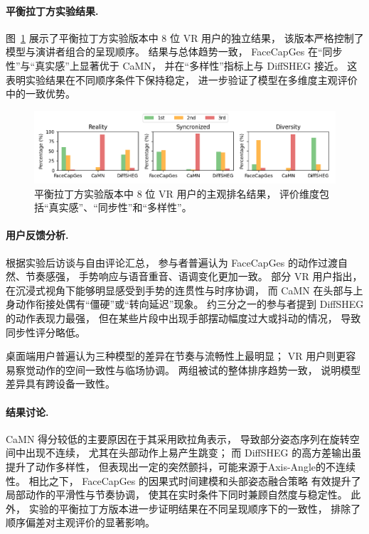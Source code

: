 \begin{table}[h]
\paragraph{平衡拉丁方实验结果.}
图~\ref{fig:userstudy_latin_square} 展示了平衡拉丁方实验版本中 8 位 VR 用户的独立结果，
该版本严格控制了模型与演讲者组合的呈现顺序。
结果与总体趋势一致，
FaceCapGes 在“同步性”与“真实感”上显著优于 CaMN，
并在“多样性”指标上与 DiffSHEG 接近。
这表明实验结果在不同顺序条件下保持稳定，
进一步验证了模型在多维度主观评价中的一致优势。

\begin{figure}[h!t]
\centering
\includegraphics[width=\linewidth]{figures/UserStudy_LatinSquare.png}
\caption{平衡拉丁方实验版本中 8 位 VR 用户的主观排名结果，
评价维度包括“真实感”、“同步性”和“多样性”。}
\label{fig:userstudy_latin_square}
\end{figure}

\paragraph{用户反馈分析.}
根据实验后访谈与自由评论汇总，
参与者普遍认为 FaceCapGes 的动作过渡自然、节奏感强，
手势响应与语音重音、语调变化更加一致。
部分 VR 用户指出，
在沉浸式视角下能够明显感受到手势的连贯性与时序协调，
而 CaMN 在头部与上身动作衔接处偶有“僵硬”或“转向延迟”现象。
约三分之一的参与者提到 DiffSHEG 的动作表现力最强，
但在某些片段中出现手部摆动幅度过大或抖动的情况，
导致同步性评分略低。

桌面端用户普遍认为三种模型的差异在节奏与流畅性上最明显；
VR 用户则更容易察觉动作的空间一致性与临场协调。
两组被试的整体排序趋势一致，
说明模型差异具有跨设备一致性。

\paragraph{结果讨论.}
CaMN 得分较低的主要原因在于其采用欧拉角表示，
导致部分姿态序列在旋转空间中出现不连续，
尤其在头部动作上易产生跳变；
而 DiffSHEG 的高方差输出虽提升了动作多样性，
但表现出一定的突然颤抖，可能来源于Axis-Angle的不连续性。
相比之下，
FaceCapGes 的因果式时间建模和头部姿态融合策略
有效提升了局部动作的平滑性与节奏协调，
使其在实时条件下同时兼顾自然度与稳定性。
此外，
实验的平衡拉丁方版本进一步证明结果在不同呈现顺序下的一致性，
排除了顺序偏差对主观评价的显著影响。


\end{table}
